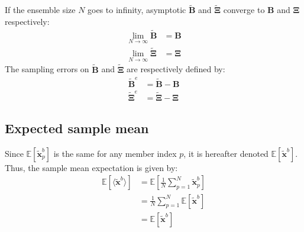\documentclass[12pt]{scrartcl}
\begin{document}
$  $\\
If the ensemble size $N$ goes to infinity, asymptotic $\widetilde{\mathbf{B}}$ and $\widetilde{\boldsymbol{\Xi}}$ converge to $\mathbf{B}$ and $\boldsymbol{\Xi}$ respectively:
\begin{subequations}
\begin{align}
\lim_{N \rightarrow \infty} \widetilde{\mathbf{B}} & = \mathbf{B} \\
\lim_{N \rightarrow \infty} \widetilde{\boldsymbol{\Xi}} & = \boldsymbol{\Xi}
\end{align}
\end{subequations}
The sampling errors on $\widetilde{\mathbf{B}}$ and $\widetilde{\boldsymbol{\Xi}}$ are respectively defined by:
\begin{subequations}
\begin{align}
\widetilde{\mathbf{B}}^e & = \widetilde{\mathbf{B}} - \mathbf{B} \\
\widetilde{\boldsymbol{\Xi}}^e & = \widetilde{\boldsymbol{\Xi}} - \boldsymbol{\Xi}
\end{align}
\end{subequations}

\subsection{Expected sample mean}
Since $\mathbb{E} \left[\widetilde{\mathbf{x}}^b_p\right]$ is the same for any member index $p$, it is hereafter denoted $\mathbb{E} \left[\widetilde{\mathbf{x}}^b\right]$. Thus, the sample mean expectation is given by:
\begin{align}
\mathbb{E} \left[\langle \widetilde{\mathbf{x}}^b \rangle\right] & = \mathbb{E} \left[\frac{1}{N} \sum_{p=1}^N \widetilde{\mathbf{x}}^b_p\right] \nonumber \\
& = \frac{1}{N} \sum_{p=1}^N \mathbb{E} \left[\widetilde{\mathbf{x}}^b\right] \nonumber \\
& = \mathbb{E} \left[\widetilde{\mathbf{x}}^b\right]
\end{align}
\end{document}
